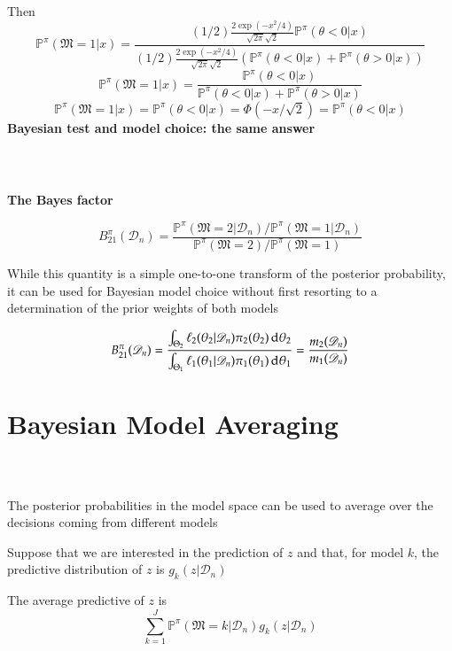 \documentclass[notes,professionalfont,11pt,usenames,dvipsnames]{beamer}
\renewcommand{\mathcal}{\mathscr}
\renewcommand{\mathcal}{\mathscr}
\renewcommand{\P}{\mathbb{P}}
\newcommand\justify{\rightskip0pt \leftskip0pt}
\newenvironment{slide}
{\begin{frame}[environment=slide]
\frametitle{\insertsection \\ \insertsubsection}\justify\setlength{\parskip}{0.5cm}\vspace{-1.5cm}}
{\end{frame}}
\begin{document}
\begin{slide}

Then
$$
\P^\pi(\mathfrak{M}=1|x)=\frac{(1/2)\frac{2\exp(-x^2/4)}{\sqrt{2\pi}\sqrt{2}}\P^\pi(\theta<0|x)}{(1/2)\frac{2\exp(-x^2/4)}{\sqrt{2\pi}\sqrt{2}}(\P^\pi(\theta<0|x)+\P^\pi(\theta>0|x))}
$$
$$
\P^\pi(\mathfrak{M}=1|x)=\frac{\P^\pi(\theta<0|x)}{\P^\pi(\theta<0|x)+\P^\pi(\theta>0|x)}
$$
$$
\P^\pi(\mathfrak{M}=1|x)=\P^\pi(\theta<0|x)=\Phi\left(-x/\sqrt{2}\right)=\P^\pi(\theta<0|x)
$$
\textbf{Bayesian test and model choice: the same answer}

\end{slide}

\begin{slide}

\textbf{The Bayes factor}

$$
B^\pi_{21}(\mathcal{D}_n) = \dfrac{ \P^\pi(\mathfrak{M}=2|\mathcal{D}_n) / \P^\pi(\mathfrak{M}=1|\mathcal{D}_n)}
{ \P^\pi(\mathfrak{M}=2)/ \P^\pi(\mathfrak{M}=1)}
$$


While this quantity is a simple one-to-one transform of the posterior probability, it can be used for Bayesian model choice without first resorting to a determination of the prior weights of both models


{\color{red} $$
B^\pi_{21}(\mathcal{D}_n)=\frac{\int_{\Theta_2}\ell_2(\theta_2|\mathcal{D}_n)\pi_2(\theta_2)\,\hbox{d}\theta_2}
{\int_{\Theta_1}\ell_1(\theta_1|\mathcal{D}_n)\pi_1(\theta_1)\,\hbox{d}\theta_1}=\frac{m_2(\mathcal{D}_n)}{m_1(\mathcal{D}_n)}
$$}

\end{slide}


\section{Bayesian Model Averaging}

\begin{slide}

The posterior probabilities in the model space can be used
to average over the decisions coming from different models


Suppose that we are interested in the prediction of
$z$ and that, for model $k$, the predictive distribution of $z$
is $g_k(z|\mathcal{D}_n)$


{\color{red} The average predictive of $z$ is
$$
\sum_{k=1}^J \P^\pi(\mathfrak{M}=k|\mathcal{D}_n)g_k(z|\mathcal{D}_n)
$$}

\end{slide}
\end{document}
